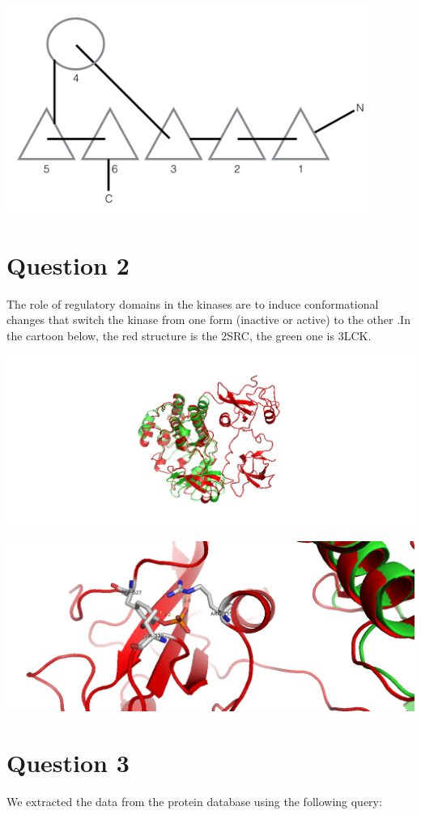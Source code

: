 \documentclass[11pt, a4paper,titlepage]{article}
\begin{document}
\includegraphics[width=12cm]{./Figures/1b.png}

\section*{Question 2}
The role of regulatory domains in the kinases are to induce
conformational changes that switch the kinase from one form (inactive
or active) to the other \cite{ConformationalPlasticityKinases}.In the
cartoon below, the red structure is the 2SRC, the green one is 3LCK.

\includegraphics[width=15cm]{./Figures/2a.png}

\includegraphics[width=15cm]{./Figures/2b.png}

\section*{Question 3}
We extracted the data from the protein database using the following query:
\end{document}
